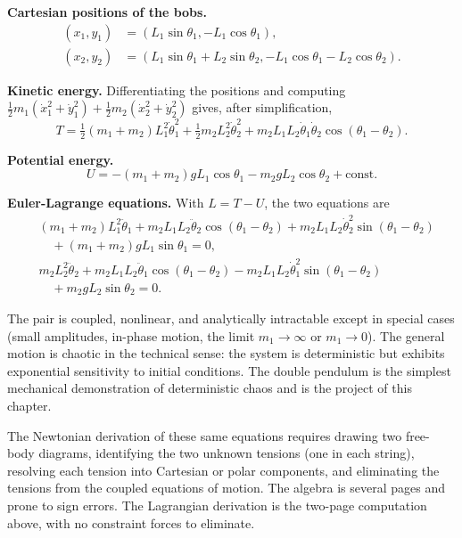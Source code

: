 

\textbf{Cartesian positions of the bobs.}
\begin{align*}
(x_1, y_1) &= (L_1 \sin\theta_1, -L_1 \cos\theta_1), \\
(x_2, y_2) &= (L_1 \sin\theta_1 + L_2 \sin\theta_2, -L_1 \cos\theta_1
- L_2 \cos\theta_2).
\end{align*}

\textbf{Kinetic energy.} Differentiating the positions and computing
$\tfrac{1}{2}m_1(\dot{x}_1^2 + \dot{y}_1^2) + \tfrac{1}{2}m_2(\dot{x}_2^2
+ \dot{y}_2^2)$ gives, after simplification,
\[
T = \tfrac{1}{2}(m_1 + m_2) L_1^2 \dot{\theta}_1^2 + \tfrac{1}{2}
m_2 L_2^2 \dot{\theta}_2^2 + m_2 L_1 L_2 \dot{\theta}_1 \dot{\theta}_2
\cos(\theta_1 - \theta_2).
\]

\textbf{Potential energy.}
\[
U = -(m_1 + m_2) g L_1 \cos\theta_1 - m_2 g L_2 \cos\theta_2 + \text{
const}.
\]

\textbf{Euler-Lagrange equations.} With $L = T - U$, the two
equations are
\begin{align*}
& (m_1 + m_2) L_1^2 \ddot{\theta}_1 + m_2 L_1 L_2 \ddot{\theta}_2 \cos
(\theta_1 - \theta_2) + m_2 L_1 L_2 \dot{\theta}_2^2 \sin(\theta_1 -
\theta_2) \\
& \quad + (m_1 + m_2) g L_1 \sin\theta_1 = 0, \\
& m_2 L_2^2 \ddot{\theta}_2 + m_2 L_1 L_2 \ddot{\theta}_1 \cos(
\theta_1 - \theta_2) - m_2 L_1 L_2 \dot{\theta}_1^2 \sin(\theta_1 -
\theta_2) \\
& \quad + m_2 g L_2 \sin\theta_2 = 0.
\end{align*}

The pair is coupled, nonlinear, and analytically intractable except
in special cases (small amplitudes, in-phase motion, the limit
$m_1 \to \infty$ or $m_1 \to 0$). The general motion is chaotic in
the technical sense: the system is deterministic but exhibits
exponential sensitivity to initial conditions. The double pendulum
is the simplest mechanical demonstration of deterministic chaos and
is the project of this chapter.

The Newtonian derivation of these same equations requires drawing two
free-body diagrams, identifying the two unknown tensions (one in each
string), resolving each tension into Cartesian or polar components,
and eliminating the tensions from the coupled equations of motion. The
algebra is several pages and prone to sign errors. The Lagrangian
derivation is the two-page computation above, with no constraint
forces to eliminate.

